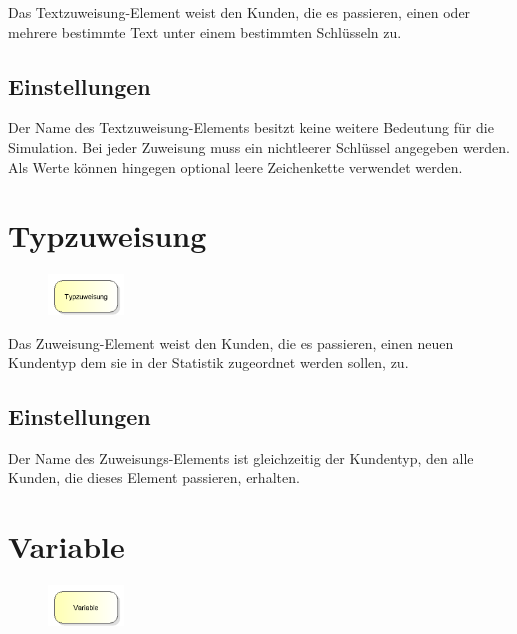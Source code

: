 Das Textzuweisung-Element weist den Kunden, die es passieren, einen oder mehrere bestimmte Text
unter einem bestimmten Schlüsseln zu.

\subsection*{Einstellungen}

Der Name des Textzuweisung-Elements besitzt keine weitere Bedeutung für die Simulation. Bei jeder
Zuweisung muss ein nichtleerer Schlüssel angegeben werden. Als Werte können hingegen optional
leere Zeichenkette verwendet werden.


\section{Typzuweisung}
\label{ref:ModelElementAssign}

\begin{figure}
\vspace{-22pt}
\includegraphics[width=2cm]{imageModelElementAssign.png}
\vspace{-22pt}
\end{figure}

Das Zuweisung-Element weist den Kunden, die es passieren, einen neuen Kundentyp dem sie in der Statistik zugeordnet werden sollen, zu.

\subsection*{Einstellungen}

Der Name des Zuweisungs-Elements ist gleichzeitig der Kundentyp, den alle Kunden, die dieses Element passieren, erhalten.


\section{Variable}
\label{ref:ModelElementSet}

\begin{figure}
\vspace{-22pt}
\includegraphics[width=2cm]{imageModelElementSet.png}
\vspace{-22pt}
\end{figure}

